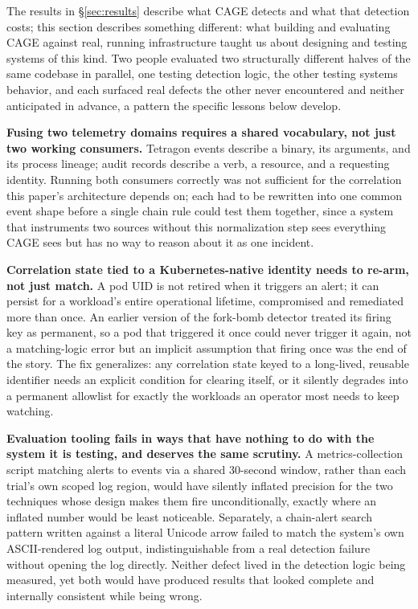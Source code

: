 \documentclass{ieeeaccess}
\begin{document}
The results in \S\ref{sec:results} describe what CAGE detects and what that
detection costs; this section describes something different: what
building and evaluating CAGE against real, running infrastructure
taught us about designing and testing systems of this kind. Two people
evaluated two structurally different halves of the same codebase in
parallel, one testing detection logic, the other testing systems
behavior, and each surfaced real defects the other never encountered
and neither anticipated in advance, a pattern the specific lessons
below develop.

\textbf{Fusing two telemetry domains requires a shared vocabulary, not
just two working consumers.} Tetragon events describe a binary, its
arguments, and its process lineage; audit records describe a verb, a
resource, and a requesting identity. Running both consumers correctly
was not sufficient for the correlation this paper's architecture
depends on; each had to be rewritten into one common event shape
before a single chain rule could test them together, since a system
that instruments two sources without this normalization step sees
everything CAGE sees but has no way to reason about it as one
incident.

\textbf{Correlation state tied to a Kubernetes-native identity needs to
re-arm, not just match.} A pod UID is not retired when it triggers an
alert; it can persist for a workload's entire operational lifetime,
compromised and remediated more than once. An earlier version of the
fork-bomb detector treated its firing key as permanent, so a pod that
triggered it once could never trigger it again, not a matching-logic
error but an implicit assumption that firing once was the end of the
story. The fix generalizes: any correlation state keyed to a
long-lived, reusable identifier needs an explicit condition for
clearing itself, or it silently degrades into a permanent allowlist
for exactly the workloads an operator most needs to keep watching.

\textbf{Evaluation tooling fails in ways that have nothing to do with
the system it is testing, and deserves the same scrutiny.} A
metrics-collection script matching alerts to events via a shared
30-second window, rather than each trial's own scoped log region,
would have silently inflated precision for the two techniques whose
design makes them fire unconditionally, exactly where an inflated
number would be least noticeable. Separately, a chain-alert search
pattern written against a literal Unicode arrow failed to match the
system's own ASCII-rendered log output, indistinguishable from a real
detection failure without opening the log directly. Neither defect
lived in the detection logic being measured, yet both would have
produced results that looked complete and internally consistent while
being wrong.
\end{document}
